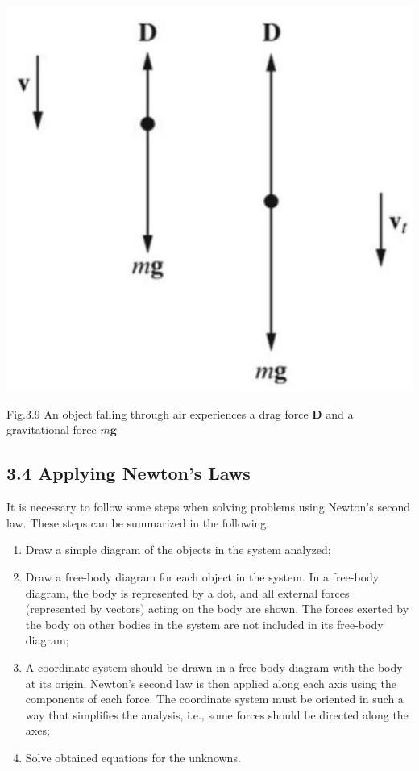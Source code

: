 \documentclass[10pt]{article}
\begin{document}
\begin{center}
\includegraphics[max width=\textwidth]{2024_09_13_db1f357d2aad0a03eb2eg-054}
\end{center}

Fig.3.9 An object falling through air experiences a drag force $\mathbf{D}$ and a gravitational force $m \mathbf{g}$

\subsection*{3.4 Applying Newton's Laws}
It is necessary to follow some steps when solving problems using Newton's second law. These steps can be summarized in the following:

\begin{enumerate}
  \item Draw a simple diagram of the objects in the system analyzed;
  \item Draw a free-body diagram for each object in the system. In a free-body diagram, the body is represented by a dot, and all external forces (represented by vectors) acting on the body are shown. The forces exerted by the body on other bodies in the system are not included in its free-body diagram;
  \item A coordinate system should be drawn in a free-body diagram with the body at its origin. Newton's second law is then applied along each axis using the components of each force. The coordinate system must be oriented in such a way that simplifies the analysis, i.e., some forces should be directed along the axes;
  \item Solve obtained equations for the unknowns.
\end{enumerate}
\end{document}
